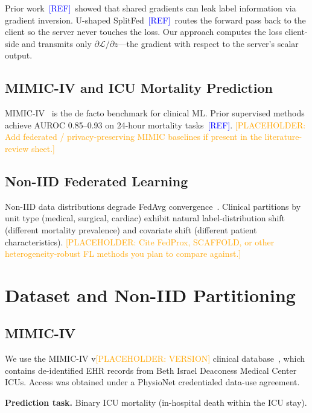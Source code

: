 \documentclass[10pt,twocolumn]{article}
\newcommand{\placeholder}[1]{\textcolor{orange}{[PLACEHOLDER: #1]}}
\newcommand{\refneeded}{\textcolor{blue}{[REF]}}
\begin{document}
Prior work~\refneeded\ showed that shared gradients can leak label
information via gradient inversion.  U-shaped SplitFed~\refneeded\
routes the forward pass back to the client so the server never touches
the loss.  Our approach computes the loss client-side and transmits
only $\partial\mathcal{L}/\partial z$---the gradient with respect to
the server's scalar output.

\subsection{MIMIC-IV and ICU Mortality Prediction}

MIMIC-IV~\cite{johnson2023} is the de facto benchmark for clinical ML.
Prior supervised methods achieve AUROC 0.85--0.93 on 24-hour mortality
tasks~\refneeded.
\placeholder{Add federated / privacy-preserving MIMIC baselines if
present in the literature-review sheet.}

\subsection{Non-IID Federated Learning}

Non-IID data distributions degrade FedAvg
convergence~\cite{li2020federated}.  Clinical partitions by unit type
(medical, surgical, cardiac) exhibit natural label-distribution shift
(different mortality prevalence) and covariate shift (different patient
characteristics).
\placeholder{Cite FedProx, SCAFFOLD, or other heterogeneity-robust FL
methods you plan to compare against.}

\section{Dataset and Non-IID Partitioning}
\label{sec:data}

\subsection{MIMIC-IV}

We use the MIMIC-IV v\placeholder{VERSION} clinical
database~\cite{johnson2023}, which contains de-identified EHR records
from Beth Israel Deaconess Medical Center ICUs.  Access was obtained
under a PhysioNet credentialed data-use agreement.

\textbf{Prediction task.}  Binary ICU mortality (in-hospital death
within the ICU stay).
\end{document}
